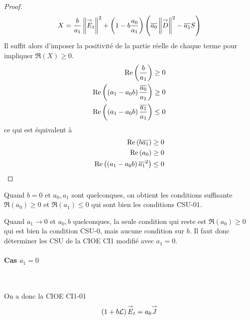 \begin{proof}
            \begin{equation}
              \label{eq:unicite:form_var:decomp_cgu_ci1_a1}
              X = \dfrac{b}{a_1}\left\lVert{\overset{\rightarrow}{E}}_t\right\rVert^2  + \left(1-b\dfrac{a_0}{a_1}\right)\left({\overline{a_0}} \left\lVert{\overset{\rightarrow}{D}}\right\rVert^2 - {\overline{a_1}} S\right)
            \end{equation}
            Il suffit alors d'imposer la positivité de la partie réelle de chaque terme pour impliquer \(\Re(X)\ge0\).
            \begin{align}
              \operatorname{Re}\left(\dfrac{b}{a_1}\right) \ge 0
              \\
              \operatorname{Re}\left(\left(a_1-a_0 b\right)\dfrac{{\overline{a_0}}}{a_1}\right) \ge 0
              \\
              \operatorname{Re}\left(\left(a_1-a_0 b\right)\dfrac{{\overline{a_1}}}{a_1}\right) \le 0
            \end{align}
            ce qui est équivalent à 
            \begin{align}
              \operatorname{Re}\left(b{\overline{a_1}}\right) \ge 0
              \\
              \operatorname{Re}\left(a_0\right) \ge 0
              \\
              \operatorname{Re}\left(\left(a_1-a_0 b\right){{\overline{a_1}}^2}\right) \le 0
            \end{align}
          \end{proof}
          Quand \(b = 0\) et \(a_0,a_1\) sont quelconques, on obtient les conditions suffisante \(\Re(a_0)\ge 0 \) et \(\Re(a_1)\le 0 \) qui sont bien les conditions CSU-01.

          Quand \(a_1 \rightarrow 0\) et \(a_0,b\) quelconques, la seule condition qui reste est \(\Re(a_0)\ge 0\) qui est bien la condition CSU-0, mais aucune condition sur \(b\). Il faut donc déterminer les CSU de la CIOE CI1 modifié avec \(a_1 = 0\).

        \paragraph{Cas \(a_1=0\)}
          ~
          
          On a donc la CIOE CI1-01
          \begin{align*}
            \left(1 + b \mathcal{L} \right) {\overset{\rightarrow}{E}}_t = a_0 {\overset{\rightarrow}{J}}
          \end{align*}

